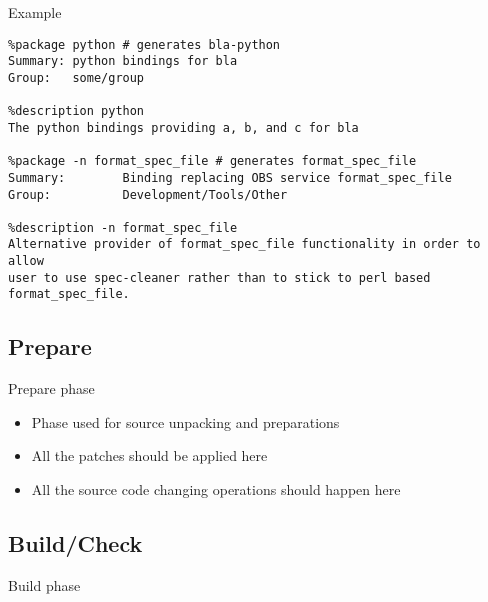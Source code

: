 \documentclass{beamer}
\begin{document}
\begin{frame}[fragile]{Example}
	\begin{small}
	\begin{verbatim}
%package python # generates bla-python
Summary: python bindings for bla
Group:   some/group

%description python
The python bindings providing a, b, and c for bla

%package -n format_spec_file # generates format_spec_file
Summary:        Binding replacing OBS service format_spec_file
Group:          Development/Tools/Other

%description -n format_spec_file
Alternative provider of format_spec_file functionality in order to allow
user to use spec-cleaner rather than to stick to perl based format_spec_file.
	\end{verbatim}
	\end{small}
\end{frame}

\subsection{Prepare}

\begin{frame}[t]{Prepare phase}
	\begin{itemize}
	\item Phase used for source unpacking and preparations
    \item All the patches should be applied here
    \item All the source code changing operations should happen here
	\end{itemize}
\end{frame}

\subsection{Build/Check}

\begin{frame}[fragile]{Build phase}
\end{frame}
\end{document}
